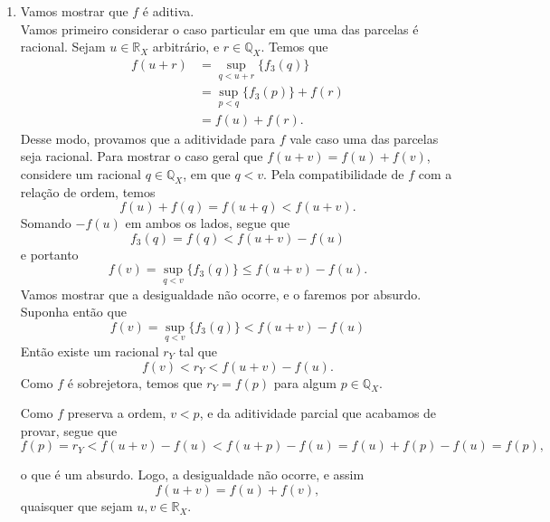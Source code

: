 \documentclass[../main.tex]{subfiles}
\begin{document}
\begin{dem}
\begin{enumerate}
\begin{enumerate}
            \item Vamos mostrar que $f$ é aditiva.\\
            Vamos primeiro considerar o caso particular em que uma das parcelas é racional.
            Sejam $u \in \mathbb{R}_X$ arbitrário, e $r \in \mathbb{Q}_X$. Temos que 
            \begin{align*}
                f(u+r) &= \sup_{q < u+r}\{f_3(q)\} \\
                &= \sup_{p<q}\{f_3(p)\} + f(r) \\
                &= f(u) + f(r).
            \end{align*}
            Desse modo, provamos que a aditividade para $f$ vale caso uma das parcelas seja racional.
            Para mostrar o caso geral que $f(u+v) = f(u) + f(v)$, considere um racional $q \in \mathbb{Q}_X$, em que $q < v$.
            Pela compatibilidade de $f$ com a relação de ordem, temos
                \[ f(u) + f(q) = f(u+q) < f(u+v). \]
            Somando $-f(u)$ em ambos os lados, segue que
            \[ f_3(q) = f(q) < f(u+v) - f(u)\] 
            e portanto
            \[ f(v) = \sup_{q<v}\{f_3(q)\} \leq f(u+v) - f(u).\]
            Vamos mostrar que a desigualdade não ocorre, e o faremos por absurdo. Suponha então que 
            \[ f(v) = \sup_{q<v}\{f_3(q)\} < f(u+v) - f(u) \]
            Então existe um racional $r_Y$ tal que 
            \[ f(v) < r_Y < f(u+v) - f(u).\]
            Como $f$ é sobrejetora, temos que $r_Y = f(p)$ para algum $p \in \mathbb{Q}_X$.

            Como $f$ preserva a ordem, $v < p$, e da aditividade parcial que acabamos de provar, segue que
            \[ f(p) = r_Y < f(u+v) - f(u) < f(u+p) - f(u) = f(u)+f(p) - f(u) = f(p), \]

            o que é um absurdo. Logo, a desigualdade não ocorre, e assim 
            \[ f(u+v) = f(u) + f(v), \] quaisquer que sejam $u,v \in \mathbb{R}_X$.


\end{enumerate}
\end{enumerate}
\end{dem}
\end{document}

